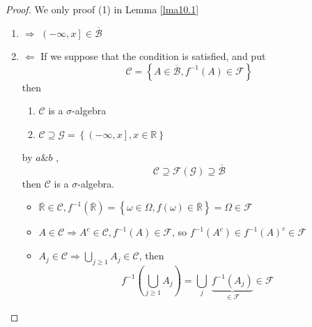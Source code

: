 \begin{proof}
	We only proof (1) in Lemma \ref{lma10.1} 
	\begin{enumerate}
		\item $ \Rightarrow $ $ \left( { - \infty ,x} \right] \in \overline {\mathcal{B}} $ 
		\item $ \Leftarrow $ If we suppose that the condition is satisfied, and put
		\begin{equation}
		\mathcal{C} = \left\{ {A \in \overline {\mathcal{B}} ,{f^{ - 1}}\left( A \right) \in {\mathcal{F}}} \right\}
		\label{eq10.9}
		\end{equation}
		then
		\begin{enumerate}
			\item $ \mathcal{C} $ is a $ \sigma $-algebra 
			\item $ \mathcal{C} \supseteq\mathcal{G} = \left\{ {\left( { - \infty ,x} \right],x \in \mathbb{R}} \right\} $
		\end{enumerate}
	by $ a\&b $ ,
	\begin{equation}
	\mathcal{C} \supseteq \mathcal{F}\left( \mathcal{G} \right) \supseteq \overline {\mathcal{B}} 
	\label{eq10.10}
	\end{equation}
	then $ \mathcal{C} $ is a $ \sigma $-algebra.
	\begin{itemize}
		\item $\overline {\mathbb{R}}  \in \mathcal{C},{f^{ - 1}}\left( {\overline {\mathbb{R}} } \right) = \left\{ {\omega  \in \Omega ,f\left( \omega  \right) \in \overline {\mathbb{R}} } \right\} = \Omega  \in {\mathcal{F}}$
		\item $ A \in \mathcal{C} \Rightarrow A^{c} \in \mathcal{C}, {f^{ - 1}}\left( A \right) \in \mathcal{F} $, so ${f^{ - 1}}\left( {{A^c}} \right) \in {f^{ - 1}}{\left( A \right)^c} \in \mathcal{F}$
		\item ${A_j} \in \mathcal{C} \Rightarrow \bigcup\limits_{j \geqslant 1} {{A_j}}  \in \mathcal{C}$, then
		\begin{equation}
		{f^{ - 1}}\left( {\bigcup\limits_{j \geqslant 1} {{A_j}} } \right) = \bigcup\limits_j {\;\underbrace {{f^{ - 1}}\left( {{A_j}} \right)}_{ \in {\mathcal{F}}}}  \in {\mathcal{F}}
		\label{eq10.11}
		\end{equation}
	\end{itemize}	
	\end{enumerate}
\end{proof}


